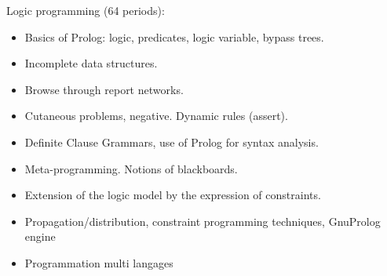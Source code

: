 Logic programming (64 periods):
\begin{itemize}
    \item Basics of Prolog: logic, predicates, logic variable, bypass trees.
    \item Incomplete data structures.
    \item Browse through report networks.
    \item Cutaneous problems, negative. Dynamic rules (assert).
    \item Definite Clause Grammars, use of Prolog for syntax analysis.
    \item Meta-programming. Notions of blackboards.
    \item Extension of the logic model by the expression of constraints.
    \item Propagation/distribution, constraint programming techniques, GnuProlog engine
    \item Programmation multi langages
\end{itemize}